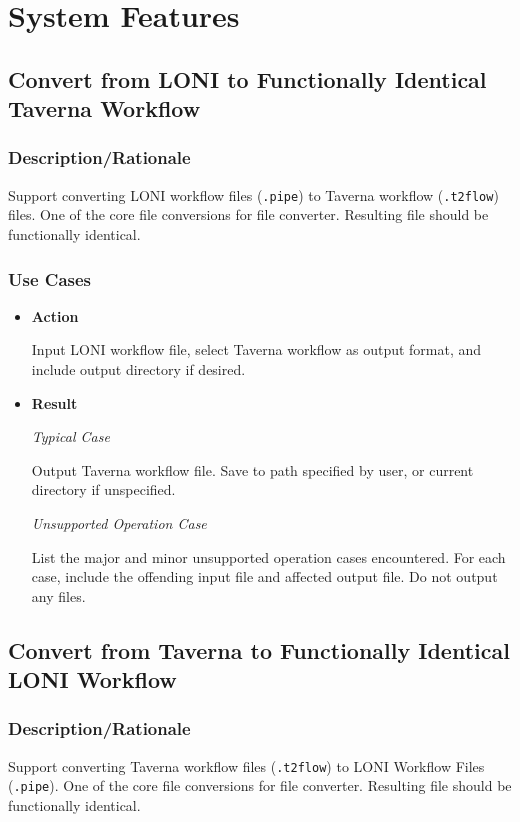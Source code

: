 \documentclass[12pt]{article}
\begin{document}
\section{System Features}
\subsection{Convert from LONI to Functionally Identical Taverna Workflow}
\label{sec:lonitaverna}
\subsubsection{Description/Rationale} Support converting LONI workflow files (\texttt{.pipe}) to Taverna workflow (\texttt{.t2flow})  files. One of the core file conversions for file converter. Resulting file should be functionally identical.


\subsubsection{Use Cases}
\begin{itemize}
\item \textbf{Action}

Input LONI workflow file, select Taverna workflow as output format, and include output directory if desired.
\item \textbf{Result}

\textit{Typical Case}

Output Taverna workflow file. Save to path specified by user, or current directory if unspecified.

\textit{Unsupported Operation Case}

List the major and minor unsupported operation cases encountered. For each case, include the offending input file and affected output file. Do not output any files.
\end{itemize}

\subsection{Convert from Taverna to Functionally Identical LONI Workflow}
\label{sec:tavernaloni}
\subsubsection{Description/Rationale} Support converting Taverna workflow files (\texttt{.t2flow}) to LONI Workflow Files (\texttt{.pipe}). One of the core file conversions for file converter. Resulting file should be functionally identical.
\end{document}
